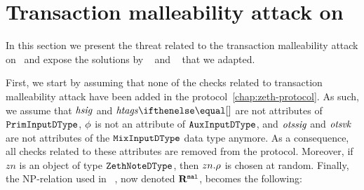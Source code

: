 \section{Transaction malleability attack on \zeth}

In this section we present the threat related to the transaction malleability attack on \zeth~and expose the solutions by \zerocash~\cite{sasson2014zerocash} and \zcash~\cite{zcashprotocol} that we adapted.

First, we start by assuming that none of the checks related to transaction malleability attack have been added in the protocol~\cref{chap:zeth-protocol}. As such, we assume that $\mathit{hsig}$ and $\htags{}$ are not attributes of ${\mathtt{PrimInputDType}}$, $\mathit{\phi}$ is not an attribute of ${\mathtt{AuxInputDType}}$, and $\mathit{otssig}$ and $\mathit{otsvk}$ are not attributes of the ${\mathtt{MixInputDType}}$ data type anymore. As a consequence, all checks related to these attributes are removed from the protocol. Moreover, if $zn$ is an object of type ${\mathtt{ZethNoteDType}}$, then $zn.\mathit{\rho}$ is chosen at random. Finally, the NP-relation used in \zeth~, now denoted $\mathbf{R}^{\texttt{mal}}$, becomes the following:

